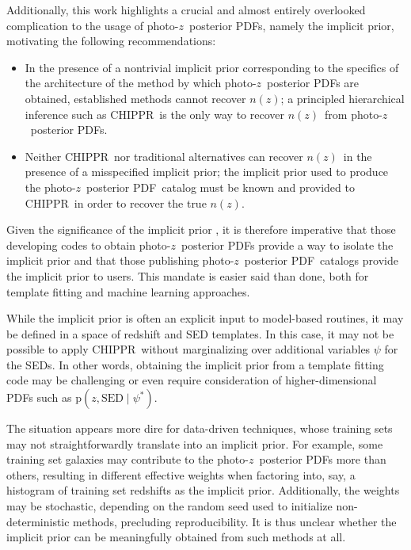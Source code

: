 \documentclass[iop]{emulateapj}
\newcommand{\todo}[3]{{\color{#2}\emph{#1}: #3}}
\newcommand{\aim}[1]{\todo{AIM}{red}{#1}}
\newcommand{\project}[1]{\textsc{#1}}
\newcommand{\Chippr}{\project{CHIPPR}}%
\newcommand{\pr}[1]{\ensuremath{\mathrm{p}(#1)}}%
\newcommand{\gvn}{\mid}%
\newcommand{\pz}{photo-$z$}
\newcommand{\pzpdf}{\pz\ posterior PDF}%
\newcommand{\nz}{$n(z)$}
\begin{document}
Additionally, this work highlights a crucial and almost entirely overlooked complication to the usage of \pzpdf s, namely the implicit prior, motivating the following recommendations:
\begin{itemize}
\item In the presence of a nontrivial implicit prior corresponding to the specifics of the architecture of the method by which \pzpdf s are obtained, established methods cannot recover \nz;
a principled hierarchical inference such as \Chippr\ is the only way to recover \nz\ from \pzpdf s.
\item %
Neither \Chippr\ nor traditional alternatives can recover \nz\ in the presence of a misspecified implicit prior;
the implicit prior used to produce the \pzpdf\ catalog must be known and provided to \Chippr\ in order to recover the true \nz.
\end{itemize}
Given the significance of the implicit prior \citep{schmidt_evaluation_2020}, it is therefore imperative that those developing codes to obtain \pzpdf s provide a way to isolate the implicit prior and that those publishing \pzpdf\ catalogs provide the implicit prior to users.
This mandate is easier said than done, both for template fitting and machine learning approaches.

While the implicit prior is often an explicit input to model-based routines, it may be defined in a space of redshift and SED templates.
In this case, it may not be possible to apply \Chippr\ without marginalizing over additional variables $\psi$ for the SEDs.
In other words, obtaining the implicit prior from a template fitting code may be challenging or even require consideration of higher-dimensional PDFs such as $\pr{z, \mathrm{SED} \gvn \psi^{*}}$.

The situation appears more dire for data-driven techniques, whose training sets may not straightforwardly translate into an implicit prior.
For example, some training set galaxies may contribute to the \pzpdf s more than others, resulting in different effective weights when factoring into, say, a histogram of training set redshifts as the implicit prior.
Additionally, the weights may be stochastic, depending on the random seed used to initialize non-deterministic methods, precluding reproducibility.
It is thus unclear whether the implicit prior can be meaningfully obtained from such methods at all.

\end{document}
